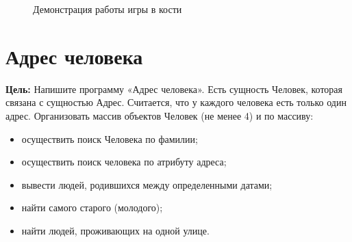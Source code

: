 \documentclass[a4paper]{article}
\begin{document}
\begin{figure}[H]
\begin{center}
        \caption{Демонстрация работы игры в кости}
        \label{sol_2}
    \end{center}
\end{figure}


\section{Адрес человека}

\textbf{Цель:} Напишите программу «Адрес человека». Есть сущность Человек, которая связана с сущностью Адрес. Считается, что у каждого человека есть только один адрес. Организовать массив объектов Человек (не менее 4) и по массиву:
\begin{itemize}
    \item осуществить поиск Человека по фамилии;
    \item осуществить поиск человека по атрибуту адреса;
    \item вывести людей, родившихся между определенными датами;
    \item найти самого старого (молодого);
    \item найти людей, проживающих на одной улице.
\end{itemize}
\end{document}
